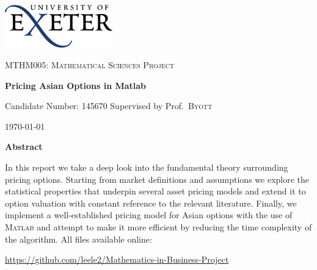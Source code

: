 \begin{titlepage}
	\centering
	\includegraphics[width=0.35\textwidth]{Title/logo.png} \par
	\vspace{0.25cm}
	{\scshape\Large MTHM005: Mathematical Sciences Project\par}
	\vspace{0.5cm}
	{\huge\bfseries Pricing Asian Options in Matlab\par}
    \vspace{0.10cm}
	{\Large Candidate Number: 145670}
	\vspace{0.2cm}
	\flushleft{}
	Supervised by	Prof.~\textsc{Byott} \hfill	{\large \today\par}
    \par
    \centering
	{\large \textbf{Abstract}}
	\par
    In this report we take a deep look into the fundamental theory surrounding pricing options. Starting from market definitions and assumptions we explore the statistical properties that underpin several asset pricing models and extend it to option valuation with constant reference to the relevant literature. Finally, we implement a well-established pricing model for Asian options with the use of \textsc{Matlab} and attempt to make it more efficient by reducing the time complexity of the algorithm.
    \vfill
    All files available online: \par \small{\url{https://github.com/leele2/Mathematics-in-Business-Project}}
\end{titlepage}